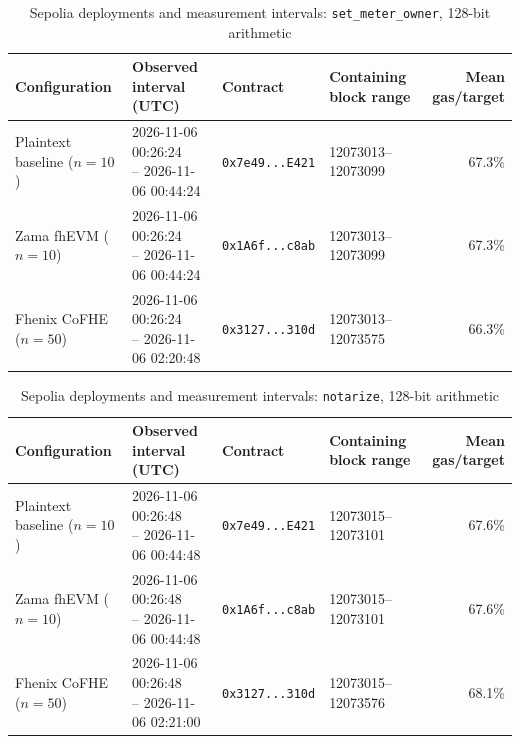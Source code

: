 \begin{table}[!t]
\caption{Sepolia deployments and measurement intervals: \texttt{set\_meter\_owner}, 128-bit arithmetic}
\label{tab:sepolia-experiment-deployments-classic-euint128-set-meter-owner}
\centering
\footnotesize
\setlength{\tabcolsep}{4pt}
\begin{tabular}{|l|l|l|l|r|}
\hline
\textbf{Configuration} &
\textbf{Observed interval (UTC)} &
\textbf{Contract} &
\textbf{Containing block range} &
\textbf{Mean gas/target} \\
\hline
Plaintext baseline (\(n=10\)) &
\shortstack[l]{2026-11-06 00:26:24 \\ -- 2026-11-06 00:44:24} &
\texttt{0x7e49...E421} &
12073013--12073099 &
67.3\% \\
\hline
Zama fhEVM (\(n=10\)) &
\shortstack[l]{2026-11-06 00:26:24 \\ -- 2026-11-06 00:44:24} &
\texttt{0x1A6f...c8ab} &
12073013--12073099 &
67.3\% \\
\hline
Fhenix CoFHE (\(n=50\)) &
\shortstack[l]{2026-11-06 00:26:24 \\ -- 2026-11-06 02:20:48} &
\texttt{0x3127...310d} &
12073013--12073575 &
66.3\% \\
\hline
\end{tabular}
\end{table}

\begin{table}[!t]
\caption{Sepolia deployments and measurement intervals: \texttt{notarize}, 128-bit arithmetic}
\label{tab:sepolia-experiment-deployments-classic-euint128-notarize}
\centering
\footnotesize
\setlength{\tabcolsep}{4pt}
\begin{tabular}{|l|l|l|l|r|}
\hline
\textbf{Configuration} &
\textbf{Observed interval (UTC)} &
\textbf{Contract} &
\textbf{Containing block range} &
\textbf{Mean gas/target} \\
\hline
Plaintext baseline (\(n=10\)) &
\shortstack[l]{2026-11-06 00:26:48 \\ -- 2026-11-06 00:44:48} &
\texttt{0x7e49...E421} &
12073015--12073101 &
67.6\% \\
\hline
Zama fhEVM (\(n=10\)) &
\shortstack[l]{2026-11-06 00:26:48 \\ -- 2026-11-06 00:44:48} &
\texttt{0x1A6f...c8ab} &
12073015--12073101 &
67.6\% \\
\hline
Fhenix CoFHE (\(n=50\)) &
\shortstack[l]{2026-11-06 00:26:48 \\ -- 2026-11-06 02:21:00} &
\texttt{0x3127...310d} &
12073015--12073576 &
68.1\% \\
\hline
\end{tabular}
\end{table}


